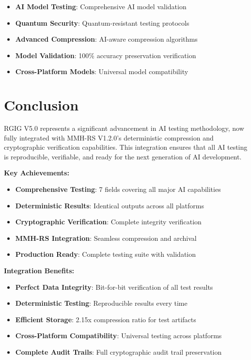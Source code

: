 \documentclass[12pt,a4paper]{article}
\begin{document}
\begin{itemize}
    \item \textbf{AI Model Testing}: Comprehensive AI model validation
    \item \textbf{Quantum Security}: Quantum-resistant testing protocols
    \item \textbf{Advanced Compression}: AI-aware compression algorithms
    \item \textbf{Model Validation}: 100\% accuracy preservation verification
    \item \textbf{Cross-Platform Models}: Universal model compatibility
\end{itemize}

\newpage

\section{Conclusion}

RGIG V5.0 represents a significant advancement in AI testing methodology, now fully integrated with MMH-RS V1.2.0's deterministic compression and cryptographic verification capabilities. This integration ensures that all AI testing is reproducible, verifiable, and ready for the next generation of AI development.

\textbf{Key Achievements:}
\begin{itemize}
    \item \textbf{Comprehensive Testing}: 7 fields covering all major AI capabilities
    \item \textbf{Deterministic Results}: Identical outputs across all platforms
    \item \textbf{Cryptographic Verification}: Complete integrity verification
    \item \textbf{MMH-RS Integration}: Seamless compression and archival
    \item \textbf{Production Ready}: Complete testing suite with validation
\end{itemize}

\textbf{Integration Benefits:}
\begin{itemize}
    \item \textbf{Perfect Data Integrity}: Bit-for-bit verification of all test results
    \item \textbf{Deterministic Testing}: Reproducible results every time
    \item \textbf{Efficient Storage}: 2.15x compression ratio for test artifacts
    \item \textbf{Cross-Platform Compatibility}: Universal testing across platforms
    \item \textbf{Complete Audit Trails}: Full cryptographic audit trail preservation
\end{itemize}
\end{document}
